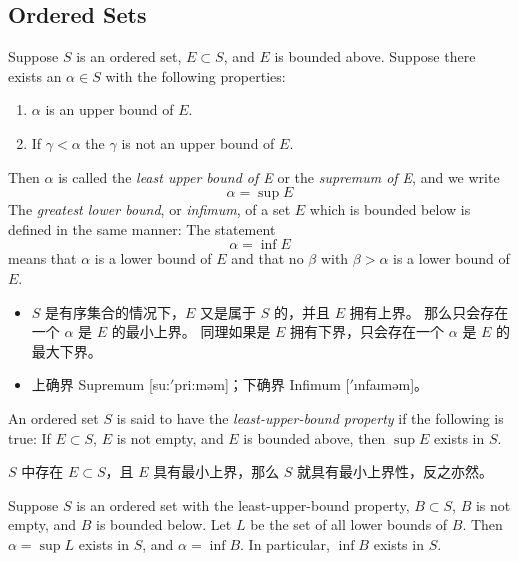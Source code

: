 \documentclass[../poma-notes.tex]{subfiles}
\begin{document}
\subsection*{Ordered Sets}

\setcounter{poma}{6}
\begin{definition}
	Suppose $S$ is an ordered set, $E \subset S$, and $E$ is bounded above.
	Suppose there exists an $\alpha \in S$ with the following properties:
	\begin{enumerate}[label=(\roman*)]
		\item $\alpha$ is an upper bound of $E$.
		\item If $\gamma < \alpha$ the $\gamma$ is not an upper bound of $E$.
	\end{enumerate}

	Then $\alpha$ is called the \textit{least upper bound of E} or the \textit{supremum of E},
	and we write
	\[ \alpha = \sup E \]
	The \textit{greatest lower bound}, or \textit{infimum}, of a set $E$ which is bounded below
	is defined in the same manner: The statement \[ \alpha = \inf E \] means that $\alpha$ is
	a lower bound of $E$ and that no $\beta$ with $\beta > \alpha$ is a lower bound of $E$.
\end{definition}

\begin{anote}
	\begin{itemize}
		\item $S$ 是有序集合的情况下，$E$ 又是属于 $S$ 的，并且 $E$ 拥有上界。
		      那么只会存在一个 $\alpha$ 是 $E$ 的最小上界。
		      同理如果是 $E$ 拥有下界，只会存在一个 $\alpha$ 是 $E$ 的最大下界。
		\item 上确界 Supremum [su:$'$pri:məm]；下确界 Infimum [$'$\i nfa\i məm]。
	\end{itemize}
\end{anote}

\setcounter{poma}{9}
\begin{definition}
	An ordered set $S$ is said to have the \textit{least-upper-bound property} if the following
	is true: If $E \subset S$, $E$ is not empty, and $E$ is bounded above, then $\sup E$ exists in $S$.
\end{definition}

\anote
$S$ 中存在 $E \subset S$，且 $E$ 具有最小上界，那么 $S$ 就具有最小上界性，反之亦然。

\begin{theorem}
	Suppose $S$ is an ordered set with the least-upper-bound property,
	$B \subset S$, $B$ is not empty, and $B$ is bounded below.
	Let $L$ be the set of all lower bounds of $B$. Then $\alpha = \sup L$
	exists in $S$, and $\alpha = \inf B$.
	In particular, $\inf B$ exists in $S$.
\end{theorem}
\end{document}

